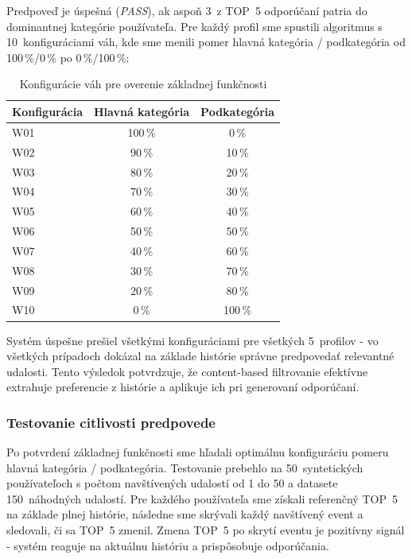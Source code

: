 Predpoveď je úspešná (\textit{PASS}), ak aspoň 3~z TOP~5 odporúčaní patria do
dominantnej kategórie používateľa. Pre každý profil sme spustili algoritmus
s 10~konfiguráciami váh, kde sme menili pomer hlavná kategória / podkategória
od 100\,\%/0\,\% po 0\,\%/100\,\%:

\begin{table}[H]
\centering
\begin{tabular}{|l|c|c|}
\hline
\textbf{Konfigurácia} & \textbf{Hlavná kategória} & \textbf{Podkategória} \\
\hline
W01 & 100\,\% & 0\,\%   \\
W02 & 90\,\%  & 10\,\%  \\
W03 & 80\,\%  & 20\,\%  \\
W04 & 70\,\%  & 30\,\%  \\
W05 & 60\,\%  & 40\,\%  \\
W06 & 50\,\%  & 50\,\%  \\
W07 & 40\,\%  & 60\,\%  \\
W08 & 30\,\%  & 70\,\%  \\
W09 & 20\,\%  & 80\,\%  \\
W10 & 0\,\%   & 100\,\% \\
\hline
\end{tabular}
\caption{Konfigurácie váh pre overenie základnej funkčnosti}
\label{tab:w_configs}
\end{table}

Systém úspešne prešiel všetkými konfiguráciami pre všetkých 5~profilov - vo
všetkých prípadoch dokázal na základe histórie správne predpovedať relevantné
udalosti. Tento výsledok potvrdzuje, že content-based filtrovanie efektívne
extrahuje preferencie z histórie a aplikuje ich pri generovaní odporúčaní.

\subsubsection{Testovanie citlivosti predpovede}

Po potvrdení základnej funkčnosti sme hľadali optimálnu konfiguráciu pomeru
hlavná kategória / podkategória. Testovanie prebehlo na 50~syntetických
používateľoch s počtom navštívených udalostí od 1 do 50 a datasete 150~náhodných
udalostí. Pre každého používateľa sme získali referenčný TOP~5 na základe plnej
histórie, následne sme skrývali každý navštívený event a sledovali, či sa TOP~5
zmenil. Zmena TOP~5 po skrytí eventu je pozitívny signál - systém reaguje na
aktuálnu históriu a prispôsobuje odporúčania.

